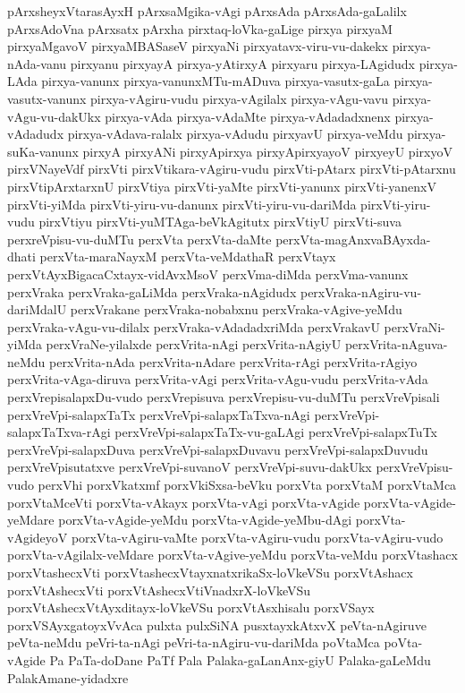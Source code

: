 {pArxsheyxVtarasAyxH
pArxsaMgika-vAgi
pArxsAda
pArxsAda-gaLalilx
pArxsAdoVna
pArxsatx
pArxha
pirxtaq-loVka-gaLige
pirxya
pirxyaM
pirxyaMgavoV
pirxyaMBASaseV
pirxyaNi
pirxyatavx-viru-vu-dakekx
pirxya-nAda-vanu
pirxyanu
pirxyayA
pirxya-yAtirxyA
pirxyaru
pirxya-LAgidudx
pirxya-LAda
pirxya-vanunx
pirxya-vanunxMTu-mADuva
pirxya-vasutx-gaLa
pirxya-vasutx-vanunx
pirxya-vAgiru-vudu
pirxya-vAgilalx
pirxya-vAgu-vavu
pirxya-vAgu-vu-dakUkx
pirxya-vAda
pirxya-vAdaMte
pirxya-vAdadadxnenx
pirxya-vAdadudx
pirxya-vAdava-ralalx
pirxya-vAdudu
pirxyavU
pirxya-veMdu
pirxya-suKa-vanunx
pirxyA
pirxyANi
pirxyApirxya
pirxyApirxyayoV
pirxyeyU
pirxyoV
pirxVNayeVdf
pirxVti
pirxVtikara-vAgiru-vudu
pirxVti-pAtarx
pirxVti-pAtarxnu
pirxVtipArxtarxnU
pirxVtiya
pirxVti-yaMte
pirxVti-yanunx
pirxVti-yanenxV
pirxVti-yiMda
pirxVti-yiru-vu-danunx
pirxVti-yiru-vu-dariMda
pirxVti-yiru-vudu
pirxVtiyu
pirxVti-yuMTAga-beVkAgitutx
pirxVtiyU
pirxVti-suva
perxreVpisu-vu-duMTu
perxVta
perxVta-daMte
perxVta-magAnxvaBAyxda-dhati
perxVta-maraNayxM
perxVta-veMdathaR
perxVtayx
perxVtAyxBigacaCxtayx-vidAvxMsoV
perxVma-diMda
perxVma-vanunx
perxVraka
perxVraka-gaLiMda
perxVraka-nAgidudx
perxVraka-nAgiru-vu-dariMdalU
perxVrakane
perxVraka-nobabxnu
perxVraka-vAgive-yeMdu
perxVraka-vAgu-vu-dilalx
perxVraka-vAdadadxriMda
perxVrakavU
perxVraNi-yiMda
perxVraNe-yilalxde
perxVrita-nAgi
perxVrita-nAgiyU
perxVrita-nAguva-neMdu
perxVrita-nAda
perxVrita-nAdare
perxVrita-rAgi
perxVrita-rAgiyo
perxVrita-vAga-diruva
perxVrita-vAgi
perxVrita-vAgu-vudu
perxVrita-vAda
perxVrepisalapxDu-vudo
perxVrepisuva
perxVrepisu-vu-duMTu
perxVreVpisali
perxVreVpi-salapxTaTx
perxVreVpi-salapxTaTxva-nAgi
perxVreVpi-salapxTaTxva-rAgi
perxVreVpi-salapxTaTx-vu-gaLAgi
perxVreVpi-salapxTuTx
perxVreVpi-salapxDuva
perxVreVpi-salapxDuvavu
perxVreVpi-salapxDuvudu
perxVreVpisutatxve
perxVreVpi-suvanoV
perxVreVpi-suvu-dakUkx
perxVreVpisu-vudo
perxVhi
porxVkatxmf
porxVkiSxsa-beVku
porxVta
porxVtaM
porxVtaMca
porxVtaMceVti
porxVta-vAkayx
porxVta-vAgi
porxVta-vAgide
porxVta-vAgide-yeMdare
porxVta-vAgide-yeMdu
porxVta-vAgide-yeMbu-dAgi
porxVta-vAgideyoV
porxVta-vAgiru-vaMte
porxVta-vAgiru-vudu
porxVta-vAgiru-vudo
porxVta-vAgilalx-veMdare
porxVta-vAgive-yeMdu
porxVta-veMdu
porxVtashacx
porxVtashecxVti
porxVtashecxVtayxnatxrikaSx-loVkeVSu
porxVtAshacx
porxVtAshecxVti
porxVtAshecxVtiVnadxrX-loVkeVSu
porxVtAshecxVtAyxditayx-loVkeVSu
porxVtAsxhisalu
porxVSayx
porxVSAyxgatoyxVvAca
pulxta
pulxSiNA
pusxtayxkAtxvX
peVta-nAgiruve
peVta-neMdu
peVri-ta-nAgi
peVri-ta-nAgiru-vu-dariMda
poVtaMca
poVta-vAgide
Pa
PaTa-doDane
PaTf
Pala
Palaka-gaLanAnx-giyU
Palaka-gaLeMdu
PalakAmane-yidadxre
}
